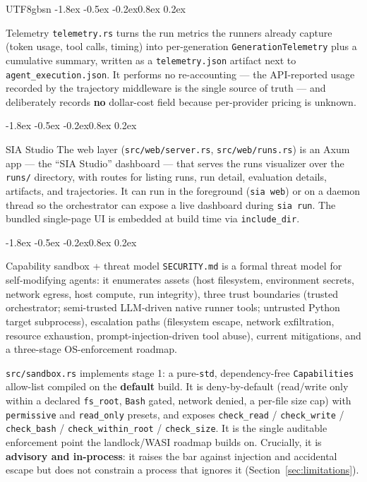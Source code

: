 \documentclass{article}
\makeatletter
\renewcommand{\subsection}{\@startsection{subsection}{2}{\z@}%
  {-1.8ex \@plus -0.5ex \@minus -0.2ex}{0.8ex \@plus 0.2ex}%
  {\normalsize\bfseries\raggedright\color{accent}}}
\makeatother
\begin{document}
\begin{CJK}{UTF8}{gbsn}
\subsection{Telemetry}
\label{sec:telemetry}
\texttt{telemetry.rs} turns the run metrics the runners already capture (token usage,
tool calls, timing) into per-generation \texttt{GenerationTelemetry} plus a
cumulative summary, written as a \texttt{telemetry.json} artifact next to
\texttt{agent\_execution.json}. It performs no re-accounting --- the API-reported
usage recorded by the trajectory middleware is the single source of truth --- and
deliberately records \textbf{no} dollar-cost field because per-provider pricing is
unknown.

\subsection{SIA Studio}
The web layer (\texttt{src/web/server.rs}, \texttt{src/web/runs.rs}) is an Axum app
--- the ``SIA Studio'' dashboard --- that serves the runs visualizer over the
\texttt{runs/} directory, with routes for listing runs, run detail, evaluation
details, artifacts, and trajectories. It can run in the foreground (\texttt{sia web})
or on a daemon thread so the orchestrator can expose a live dashboard during
\texttt{sia run}. The bundled single-page UI is embedded at build time via
\texttt{include\_dir}.

\subsection{Capability sandbox + threat model}
\texttt{SECURITY.md} is a formal threat model for self-modifying agents: it
enumerates assets (host filesystem, environment secrets, network egress, host
compute, run integrity), three trust boundaries (trusted orchestrator; semi-trusted
LLM-driven native runner tools; untrusted Python target subprocess), escalation
paths (filesystem escape, network exfiltration, resource exhaustion,
prompt-injection-driven tool abuse), current mitigations, and a three-stage
OS-enforcement roadmap.

\texttt{src/sandbox.rs} implements stage 1: a pure-\texttt{std}, dependency-free
\texttt{Capabilities} allow-list compiled on the \textbf{default} build. It is
deny-by-default (read/write only within a declared \texttt{fs\_root}, \texttt{Bash}
gated, network denied, a per-file size cap) with \texttt{permissive} and
\texttt{read\_only} presets, and exposes \texttt{check\_read} / \texttt{check\_write}
/ \texttt{check\_bash} / \texttt{check\_within\_root} / \texttt{check\_size}. It is
the single auditable enforcement point the landlock/WASI roadmap builds on.
Crucially, it is \textbf{advisory and in-process}: it raises the bar against
injection and accidental escape but does not constrain a process that ignores it
(Section~\ref{sec:limitations}).


\end{CJK}
\end{document}
